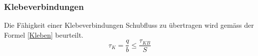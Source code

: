 
  \subsubsection{Klebeverbindungen}
  Die Fähigkeit einer Klebeverbindungen Schubfluss zu übertragen wird gemäss der Formel \ref{Kleben} beurteilt.
  \begin{equation}
    \label{Kleben}
    \tau_K = \frac{q}{b} \leq \frac{\tau_{KB}}{S}
  \end{equation}


\newpage
